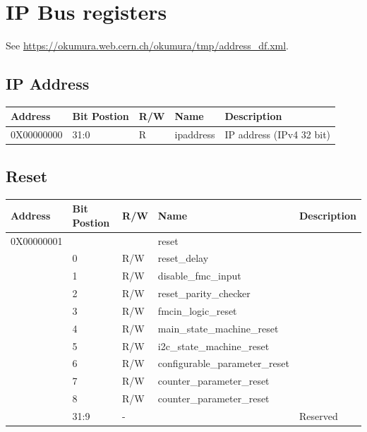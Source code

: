 \documentclass[11pt,letterpaper]{article}
\begin{document}
\newpage
\clearpage 

\section {IP Bus registers}

See \url{https://okumura.web.cern.ch/okumura/tmp/address_df.xml}. 
\subsection {IP Address}

\begin{table}[h!]
\centering
\begin{tabular}{|l|l|l|l|l|}
\hline
Address  & Bit Postion & R/W & Name & Description \\ \hline
0X00000000           & 31:0        & R   & ipaddress & IP address (IPv4 32 bit)  \\ \hline
\end{tabular}
\end{table}

\subsection {Reset}

\begin{table}[h!]
\centering
\begin{tabular}{|l|l|l|l|l|}
\hline
Address  & Bit Postion & R/W & Name  & Description \\ \hline
0X00000001           &             &     & reset &   \\ \hline
                     & 0           & R/W & reset\_delay &  \\ \hline
                     & 1           & R/W & disable\_fmc\_input &  \\ \hline
                     & 2           & R/W & reset\_parity\_checker &  \\ \hline
                     & 3           & R/W & fmcin\_logic\_reset &  \\ \hline
                     & 4           & R/W & main\_state\_machine\_reset  &  \\ \hline
                     & 5           & R/W & i2c\_state\_machine\_reset &  \\ \hline
                     & 6           & R/W & configurable\_parameter\_reset &  \\ \hline
                     & 7           & R/W & counter\_parameter\_reset &  \\ \hline
                     & 8           & R/W & counter\_parameter\_reset &  \\ \hline
                     & 31:9        &  -  & & Reserved  \\ \hline
\end{tabular}
\end{table}
\end{document}
